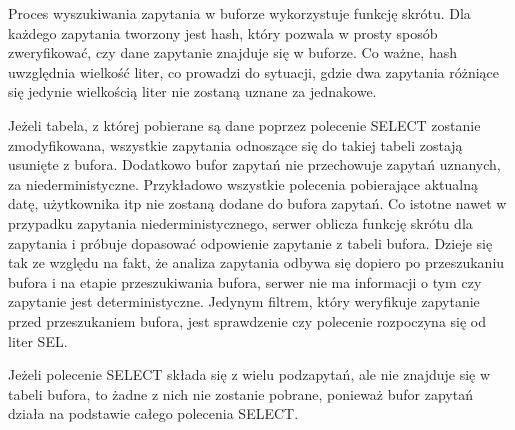 Proces wyszukiwania zapytania w buforze wykorzystuje funkcję skrótu. Dla każdego zapytania tworzony jest hash, który pozwala w prosty sposób zweryfikować, czy dane zapytanie znajduje się w buforze. Co ważne, hash uwzględnia wielkość liter, co prowadzi do sytuacji, gdzie dwa zapytania różniące się jedynie wielkością liter nie zostaną uznane za jednakowe.

Jeżeli tabela, z której pobierane są dane poprzez polecenie SELECT  zostanie zmodyfikowana, wszystkie zapytania odnoszące się do takiej tabeli zostają usunięte z bufora. Dodatkowo bufor zapytań nie przechowuje zapytań uznanych, za niederministyczne. Przykładowo wszystkie polecenia pobierające aktualną datę, użytkownika itp nie zostaną dodane do bufora zapytań. Co istotne nawet w przypadku zapytania niederministycznego, serwer oblicza funkcję skrótu dla zapytania i próbuje dopasować odpowienie zapytanie z tabeli bufora. Dzieje się tak ze względu na fakt, że analiza zapytania odbywa się dopiero po przeszukaniu bufora i na etapie przeszukiwania bufora, serwer nie ma informacji o tym czy zapytanie jest deterministyczne. Jedynym filtrem, który weryfikuje zapytanie przed przeszukaniem bufora, jest sprawdzenie czy polecenie rozpoczyna się od liter SEL.

Jeżeli polecenie SELECT składa się z wielu podzapytań, ale nie znajduje się w tabeli bufora, to żadne z nich nie zostanie pobrane, ponieważ bufor zapytań działa na podstawie całego polecenia SELECT.
